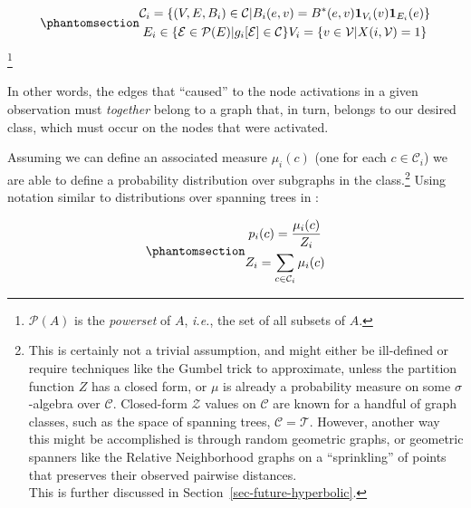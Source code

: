 \documentclass[%
	12pt,
		oneside,
		letterpaper
]{book}
\begin{document}
\begin{equation}\phantomsection\label{eq-subgraph-family}{
\begin{gathered}
\mathcal{C}_i = \{(V,E,B_i) \in\mathcal{C}|B_i(e,v)=B^*(e,v)\mathbf{1}_{V_i}(v)\mathbf{1}_{E_i}(e)\}\\
E_i\in\{\mathcal{E}\in\mathcal{P}(E)| g_i[\mathcal{E}]\in\mathcal{C}\}
V_i = \{v\in \mathcal{V} | X(i,\mathcal{V})=1\}
\end{gathered}
}\end{equation}\footnote{\(\mathcal{P}(A)\) is the \emph{powerset} of \(A\), \emph{i.e.}, the set of all subsets of \(A\).}

In other words, the edges that ``caused'' to the node activations in a given observation must \emph{together} belong to a graph that, in turn, belongs to our desired class, which must occur on the nodes that were activated.

Assuming we can define an associated measure \(\mu_i(c)\) (one for each \(c\in\mathcal{C}_i\)) we are able to define a probability distribution over subgraphs in the class.\footnote{
  This is certainly not a trivial assumption, and might either be ill-defined or require techniques like the Gumbel trick\autocite{GradientEstimationStochastic_Paulus2020} to approximate, unless the partition function \(Z\) has a closed form, or \(\mu\) is already a probability measure on some \(\sigma\)-algebra over \(\mathcal{C}\).
  Closed-form \(\mathcal{Z}\) values on \(\mathcal{C}\) are known for a handful of graph classes, such as the space of spanning trees, \(\mathcal{C}=\mathcal{T}\).
  However, another way this might be accomplished is through random geometric graphs\autocite{RandomPlaneNetworks_Gilbert1961}, or geometric spanners like the Relative Neighborhood \autocite{Relativeneighborhoodgraphs_Jaromczyk1992} graphs on a ``sprinkling'' of points that preserves their observed pairwise distances.\\
  This is further discussed in Section~\ref{sec-future-hyperbolic}.}
Using notation similar to distributions over spanning trees in \textcite{EfficientComputationExpectations_Zmigrod2021}:

\begin{equation}\phantomsection\label{eq-subgraph-prob}{
\begin{gathered}
p_i(c) = \frac{\mu_i(c)}{Z_i}\\
Z_i = \sum_{c\in\mathcal{C}_i} \mu_i(c)
\end{gathered}
}\end{equation}
\end{document}
